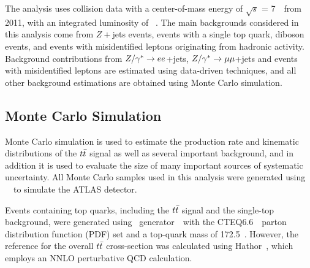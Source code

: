 The analysis uses collision data with a center-of-mass energy of
$\sqrt{s}$ = 7~\TeV\ from 2011, with an integrated luminosity of \lumitotpm~\cite{Aad:2011dr, ATLAS:2011cia}.
The main backgrounds considered in this analysis come from
$Z+$jets events, events with a single top quark,
diboson events, and events with misidentified leptons originating from hadronic activity.
Background contributions from
$Z/\gamma^{*} \rightarrow ee$+jets, $Z/\gamma^{*} \rightarrow\mu\mu$+jets and events with
misidentified leptons are estimated using data-driven techniques, and all
other background estimations are obtained using Monte Carlo simulation.




\subsection{Monte Carlo Simulation}
\label{s:mc}


Monte Carlo simulation is used to estimate the production rate and kinematic distributions of the $t\bar{t}$ signal as well as several important background, 
and in addition it is used to evaluate the size of many important sources of systematic uncertainty.
All Monte Carlo samples used in this analysis were generated using \GEANT~\cite{Agostinelli:2002hh}\
to simulate the ATLAS detector.



Events containing top quarks, including the $t\bar{t}$ signal and the single-top background,
were generated using \MCatNLO\ generator~\cite{Frixione:2007vw,Frixione:2003ei,Frixione:2005vw}\
with the CTEQ6.6~\cite{Nadolsky:2008zw}\ parton distribution function (PDF)
set and a top-quark mass of 172.5~\GeV.
However, the reference for the overall $t\bar{t}$ cross-section was calculated using {\sc Hathor}~\cite{Aliev:2010gj},
which employs an NNLO perturbative QCD calculation.

